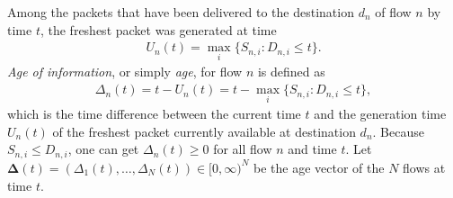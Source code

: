 Among the packets that have been delivered to the destination  $d_n$ of flow $n$ by time $t$, the freshest packet was generated at time  
\begin{align}
U_{n} (t) =\max_i \{S_{n,i}: D_{n,i} \leq t\}.
\end{align}
 \emph{Age of information}, or simply \emph{age}, for flow $n$ is defined as \cite{Song1990,KaulYatesGruteser-Infocom2012}
\begin{align}\label{eq_age}
\Delta_{n} (t) = t - U_{n} (t) = t - \max_i \{S_{n,i}: D_{n,i} \leq t\},
\end{align}
which is the time difference between  the current time $t$ and the generation time $U_{n} (t)$ of the freshest packet currently available at destination $d_n$. Because $S_{n,i}\leq D_{n,i}$,  one can get  $\Delta_{n} (t)\geq 0$ for all flow $n$ and time $t$. Let $\bm{\Delta}(t)=(\Delta_{1} (t),\ldots,\Delta_{N} (t)) \in [0,\infty)^N$ be the age vector of the $N$ flows at time $t$. 






